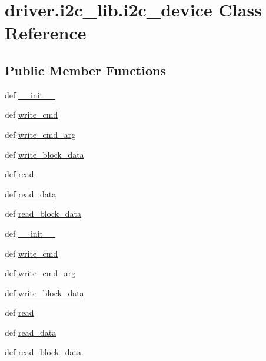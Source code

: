 \hypertarget{classdriver_1_1i2c__lib_1_1i2c__device}{}\section{driver.\+i2c\+\_\+lib.\+i2c\+\_\+device Class Reference}
\label{classdriver_1_1i2c__lib_1_1i2c__device}
\subsection*{Public Member Functions}
\begin{DoxyCompactItemize}
\item 
def \hyperlink{classdriver_1_1i2c__lib_1_1i2c__device_a6f4de0589e9fc9d80dfcbe78764adca6}{\+\_\+\+\_\+init\+\_\+\+\_\+}
\item 
def \hyperlink{classdriver_1_1i2c__lib_1_1i2c__device_a4793439f363c2b22a7f3beae6074f755}{write\+\_\+cmd}
\item 
def \hyperlink{classdriver_1_1i2c__lib_1_1i2c__device_ae998e6b6651a038c5b5466ae941e0eb8}{write\+\_\+cmd\+\_\+arg}
\item 
def \hyperlink{classdriver_1_1i2c__lib_1_1i2c__device_ae270018219f2f96ec9e37e36065d2edc}{write\+\_\+block\+\_\+data}
\item 
def \hyperlink{classdriver_1_1i2c__lib_1_1i2c__device_a9a8d9b4cc3d3890baa0738c9fa60ef4b}{read}
\item 
def \hyperlink{classdriver_1_1i2c__lib_1_1i2c__device_a7960797223c6a315d764f8b1ff11a8f2}{read\+\_\+data}
\item 
def \hyperlink{classdriver_1_1i2c__lib_1_1i2c__device_ad837253a1137bd4ae725f80640ace947}{read\+\_\+block\+\_\+data}
\item 
def \hyperlink{classdriver_1_1i2c__lib_1_1i2c__device_a6f4de0589e9fc9d80dfcbe78764adca6}{\+\_\+\+\_\+init\+\_\+\+\_\+}
\item 
def \hyperlink{classdriver_1_1i2c__lib_1_1i2c__device_a4793439f363c2b22a7f3beae6074f755}{write\+\_\+cmd}
\item 
def \hyperlink{classdriver_1_1i2c__lib_1_1i2c__device_ae998e6b6651a038c5b5466ae941e0eb8}{write\+\_\+cmd\+\_\+arg}
\item 
def \hyperlink{classdriver_1_1i2c__lib_1_1i2c__device_ae270018219f2f96ec9e37e36065d2edc}{write\+\_\+block\+\_\+data}
\item 
def \hyperlink{classdriver_1_1i2c__lib_1_1i2c__device_a9a8d9b4cc3d3890baa0738c9fa60ef4b}{read}
\item 
def \hyperlink{classdriver_1_1i2c__lib_1_1i2c__device_a7960797223c6a315d764f8b1ff11a8f2}{read\+\_\+data}
\item 
def \hyperlink{classdriver_1_1i2c__lib_1_1i2c__device_ad837253a1137bd4ae725f80640ace947}{read\+\_\+block\+\_\+data}
\end{DoxyCompactItemize}
